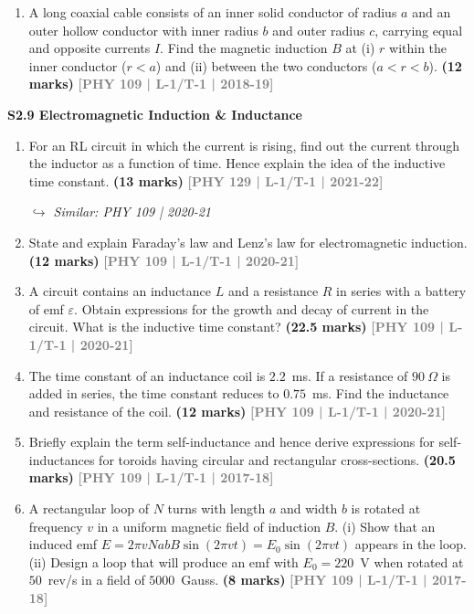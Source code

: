 \documentclass[12pt,a3paper]{article}
\newcommand{\yr}[1]{\hfill\textcolor{gray}{\small\textbf{[#1]}}}
\newcommand{\mk}[1]{\textcolor{orange!70!black}{\small\textbf{(#1 marks)}}}
\newcommand{\variant}[1]{\par\vspace{1pt}\textcolor{blue!50!black}%
  {\footnotesize\textit{$\hookrightarrow$ Similar: #1}}}
\newcommand{\subtopic}[2]{%
  \vspace{10pt}
  \noindent\begin{tcolorbox}[colback=#1!8,colframe=#1,boxrule=0.6pt,arc=4pt,
    left=6pt,right=6pt,top=4pt,bottom=4pt]
    \small\bfseries\textcolor{#1}{#2}
  \end{tcolorbox}
  \vspace{2pt}
}
\begin{document}
\begin{enumerate}
\item A long coaxial cable consists of an inner solid conductor of radius $a$ and an outer hollow conductor with inner radius $b$ and outer radius $c$, carrying equal and opposite currents $I$. Find the magnetic induction $B$ at (i) $r$ within the inner conductor ($r < a$) and (ii) between the two conductors ($a < r < b$).
\mk{12} \yr{PHY 109 | L-1/T-1 | 2018-19}



\end{enumerate}

\label{sec:s29}
\subtopic{cA}{S2.9 \quad Electromagnetic Induction \& Inductance}

\begin{enumerate}

\item For an RL circuit in which the current is rising, find out the current through the inductor as a function of time. Hence explain the idea of the inductive time constant.
\mk{13} \yr{PHY 129 | L-1/T-1 | 2021-22}
\variant{PHY 109 | 2020-21}

\item State and explain Faraday's law and Lenz's law for electromagnetic induction.
\mk{12} \yr{PHY 109 | L-1/T-1 | 2020-21}

\item A circuit contains an inductance $L$ and a resistance $R$ in series with a battery of emf $\varepsilon$. Obtain expressions for the growth and decay of current in the circuit. What is the inductive time constant?
\mk{22.5} \yr{PHY 109 | L-1/T-1 | 2020-21}

\item The time constant of an inductance coil is $2.2$~ms. If a resistance of $90\ \Omega$ is added in series, the time constant reduces to $0.75$~ms. Find the inductance and resistance of the coil.
\mk{12} \yr{PHY 109 | L-1/T-1 | 2020-21}

\item Briefly explain the term self-inductance and hence derive expressions for self-inductances for toroids having circular and rectangular cross-sections.
\mk{20.5} \yr{PHY 109 | L-1/T-1 | 2017-18}

\item A rectangular loop of $N$ turns with length $a$ and width $b$ is rotated at frequency $v$ in a uniform magnetic field of induction $B$. (i) Show that an induced emf $E = 2\pi v N ab B\sin(2\pi v t) = E_0\sin(2\pi v t)$ appears in the loop. (ii) Design a loop that will produce an emf with $E_0 = 220$~V when rotated at $50$~rev/s in a field of $5000$~Gauss.
\mk{8} \yr{PHY 109 | L-1/T-1 | 2017-18}


\end{enumerate}
\end{document}
